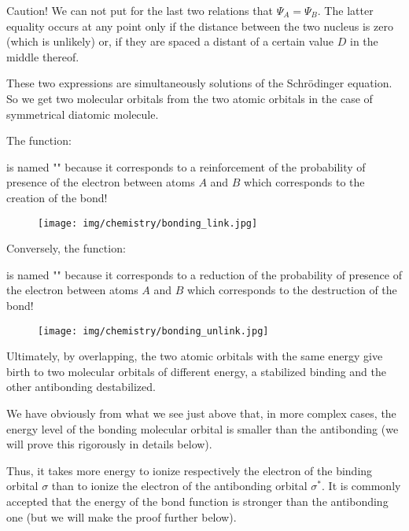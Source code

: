 	\begin{tcolorbox}[title=Remark,colframe=black,arc=10pt]
	Caution! We can not put for the last two relations that $\Psi_A=\Psi_B$. The latter equality occurs at any point only if the distance between the two nucleus is zero (which is unlikely) or, if they are spaced a distant of a certain value $D$ in the middle thereof.
	\end{tcolorbox}
	These two expressions are simultaneously solutions of the Schrödinger equation. So we get two molecular orbitals from the two atomic orbitals in the case of symmetrical diatomic molecule.
	
	The function:
	
	is named "" because it corresponds to a reinforcement of the probability of presence of the electron between atoms $A$ and $B$ which corresponds to the creation of the bond!
	\begin{figure}[H]
		\begin{center}
		\texttt{[image: img/chemistry/bonding\_link.jpg]}
		\end{center}	
	\end{figure}
		
	Conversely, the function:
	
	is named "" because it corresponds to a reduction of the probability of presence of the electron between atoms $A$ and $B$ which corresponds to the destruction of the bond!
	\begin{figure}[H]
		\begin{center}
		\texttt{[image: img/chemistry/bonding\_unlink.jpg]}
		\end{center}	
	\end{figure}
	
	Ultimately, by overlapping, the two atomic orbitals with the same energy give birth to two molecular orbitals of different energy, a stabilized binding and the other antibonding destabilized.

	We have obviously from what we see just above that, in more complex cases, the energy level of the bonding molecular orbital is smaller than the antibonding (we will prove this rigorously in details below).

	Thus, it takes more energy to ionize respectively the electron of the binding orbital $\sigma$ than to ionize the electron of the antibonding orbital $\sigma^{*}$. It is commonly accepted that the energy of the bond function is stronger than the antibonding one (but we will make the proof further below).

